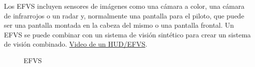 Los EFVS incluyen sensores de imágenes como una cámara a color, una cámara de infrarrojos o un radar y, normalmente una pantalla para el piloto, que puede ser una pantalla montada en la cabeza del mismo o una pantalla frontal. Un EFVS se puede combinar con un sistema de visión sintético para crear un sistema de visión combinado.
\href{https://www.youtube.com/watch?v=phbZintCgVA}{Video de un HUD/EFVS}.

\begin{figure}[!htb]
  \centering
{}
  
  \caption{EFVS}
\label{fig:01.efvs}
\end{figure}


